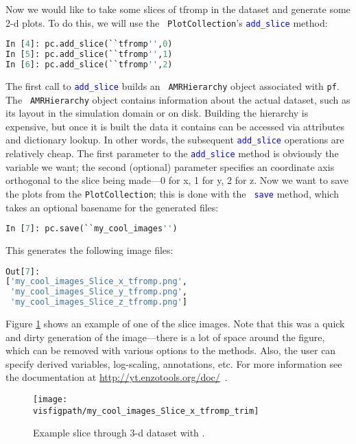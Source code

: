 Now we would like to take some slices of tfromp in the dataset and
generate some 2-d plots.  To do this, we will use the {\tt
  PlotCollection}'s \textcolor{blue}{\tt add\_slice} method:
\begin{lstlisting}[language=Python]
In [4]: pc.add_slice(``tfromp'',0)
In [5]: pc.add_slice(``tfromp'',1)
In [6]: pc.add_slice(``tfromp'',2)
\end{lstlisting}
The first call to \textcolor{blue}{\tt add\_slice} builds an {\tt
  AMRHierarchy} object associated with {\tt pf}.  The {\tt
  AMRHierarchy} object contains information about the actual dataset,
such as its layout in the simulation domain or on disk.  Building the
hierarchy is expensive, but once it is built the data it contains can
be accessed via attributes and dictionary lookup.  In other words, the
subsequent \textcolor{blue}{\tt add\_slice} operations are relatively
cheap.  The first parameter to the \textcolor{blue}{\tt add\_slice}
method is obviously the variable we want; the second (optional)
parameter specifies an coordinate axis orthogonal to the slice being
made---0 for x, 1 for y, 2 for z.  Now we want to save the plots from
the {\tt PlotCollection}; this is done with the \textcolor{blue}{\tt
  save} method, which takes an optional basename for the generated files:
\begin{lstlisting}[language=Python]
In [7]: pc.save(``my_cool_images'')
\end{lstlisting}
This generates the following image files:
\begin{lstlisting}[language=Python]
Out[7]: 
['my_cool_images_Slice_x_tfromp.png',
 'my_cool_images_Slice_y_tfromp.png',
 'my_cool_images_Slice_z_tfromp.png']
\end{lstlisting}
Figure \ref{fig:yt_slice} shows an example of one of the slice images.
Note that this was a quick and dirty generation of the image---there
is a lot of space around the figure, which can be removed with various
options to the \yt methods.  Also, the user can specify derived
variables, log-scaling, annotations, etc. For more information see the
documentation at \url{http://yt.enzotools.org/doc/}\, .

\begin{figure}[!h]\label{fig:yt_slice}
\centering
\texttt{[image: \\visfigpath/my\_cool\_images\_Slice\_x\_tfromp\_trim]}
\caption{Example slice through 3-d dataset with \yt.}
\end{figure}

